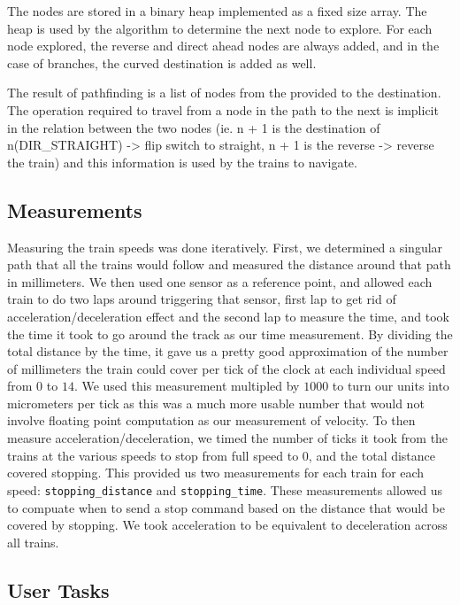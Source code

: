 \documentclass[12pt]{article}
\begin{document}
The nodes are stored in a binary heap implemented as a fixed size array. The heap is used by the algorithm to determine
the next node to explore. For each node explored, the reverse and direct ahead nodes are always added, and in the case
of branches, the curved destination is added as well.

The result of pathfinding is a list of nodes from the provided to the destination. The operation required to travel from
a node in the path to the next is implicit in the relation between the two nodes (ie. n + 1 is the destination of
n(DIR\_STRAIGHT) -> flip switch to straight, n + 1 is the reverse -> reverse the train) and this information is used by
the trains to navigate.
\\[1\baselineskip]
\subsection{Measurements}
Measuring the train speeds was done iteratively.  First, we determined a singular path that all the trains would follow and measured the distance around that path in millimeters.  We then used one sensor as a reference point, and allowed each train to do two laps around triggering that sensor, first lap to get rid of acceleration/deceleration effect and the second lap to measure the time, and took the time it took to go around the track as our time measurement.  By dividing the total distance by the time, it gave us a pretty good approximation of the number of millimeters the train could cover per tick of the clock at each individual speed from $0$ to $14$.  We used this measurement multipled by $1000$ to turn our units into micrometers per tick as this was a much more usable number that would not involve floating point computation as our measurement of velocity.  To then measure acceleration/deceleration, we timed the number of ticks it took from the trains at the various speeds to stop from full speed to $0$, and the total distance covered stopping.  This provided us two measurements for each train for each speed: {\tt stopping\_distance} and {\tt stopping\_time}.  These measurements allowed us to compuate when to send a stop command based on the distance that would be covered by stopping.  We took acceleration to be equivalent to deceleration across all trains.
\\[1\baselineskip]
\subsection{User Tasks}
\end{document}
